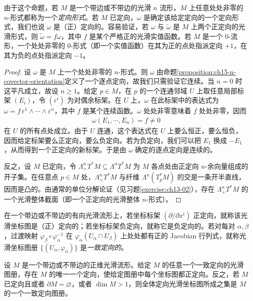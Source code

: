 \documentclass[../../main.tex]{subfiles}
\begin{document}
\begin{remark}
由于这个命题，若 $M$ 是一个带边或不带边的光滑 $n$ 流形，$M$ 上任意处处非零的 $n$-形式都称为一个\emph{定向形式}。若 $M$ 已定向，$\omega$ 是确定该给定定向的一个定向形式，我们也说 $\omega$ 是（正）定向的。容易验证，若 $\omega$ 与 $\widetilde\omega$ 是 $M$ 上两个正定向的光滑形式，则 $\widetilde\omega=f\omega$，其中 $f$ 是某个严格正的光滑实值函数。若 $M$ 是一个 $0$-流形，一个处处非零的 $0$-形式（即一个实值函数）在其为正的点处指派定向 $+1$，在其为负的点处指派定向 $-1$。
\end{remark}

\begin{proof}
设 $\omega$ 是 $M$ 上一个处处非零的 $n$-形式。则 $\omega$ 由命题\ref{proposition:ch15-n-covector-orientation}定义了一个逐点定向，故我们只需验证它连续。当 $n=0$ 时这平凡成立，故设 $n\geqslant1$。给定 $p\in M$，在 $p$ 的一个连通邻域 $U$ 上取任意局部标架 $(E_i)$，令 $(\varepsilon^i)$ 为对偶余标架。在 $U$ 上，$\omega$ 在此标架中的表达式为 $\omega=f\,\varepsilon^1\wedge\cdots\wedge\varepsilon^n$，其中 $f$ 是某个连续函数。$\omega$ 处处非零意味着 $f$ 处处非零，因而
\begin{align*}
\omega(E_1,\cdots ,E_n)=f\ne0
\end{align*}
在 $U$ 的所有点处成立。由于 $U$ 连通，这个表达式在 $U$ 上要么恒正，要么恒负，因而给定标架要么正定向，要么负定向。若为负定向，我们可以把 $E_1$ 换成 $-E_1$，从而得到一个正定向的新标架。于是由 $\omega$ 确定的逐点定向是连续的。

反之，设 $M$ 已定向，令 $\Lambda^n_+T^*M\subseteq\Lambda^n T^*M$ 为 $M$ 各点处由正定向 $n$-余向量组成的开子集。在任意点 $p\in M$ 处，$\Lambda^n_+T^*M$ 与纤维 $\Lambda^n(T^*_pM)$ 的交是一条开半直线，因而是凸的。由通常的单位分解论证（见习题\ref{exercise:ch13-02}），存在 $\Lambda^n_+T^*M$ 的一个光滑整体截面（即一个正定向的光滑整体 $n$-形式）。
\end{proof}

在一个带边或不带边的有向光滑流形上，若坐标标架 $(\partial/\partial x^i)$ 正定向，就称该光滑坐标图是（正）定向的；若坐标标架负定向，就称它是负定向的。若对每对 $\alpha,\beta$，过渡映射 $\varphi_\beta\circ\varphi_\alpha^{-1}$ 在 $\varphi_\alpha(U_\alpha\cap U_\beta)$ 上处处都有正的 Jacobian 行列式，就称光滑坐标图册 $\{(U_\alpha,\varphi_\alpha)\}$ 是\emph{一致定向的}。

\begin{proposition}[坐标图册所确定的定向]\label{proposition:ch15-atlas-orientation}
设 $M$ 是一个带边或不带边的正维光滑流形。给定 $M$ 的任意一个一致定向的光滑图册，存在 $M$ 的唯一一个定向，使给定图册中每个坐标图都正定向。反之，若 $M$ 已定向且或者 $\partial M=\varnothing$，或者 $\dim M>1$，则全体定向光滑坐标图所成之集是 $M$ 的一个一致定向图册。
\end{proposition}
\end{document}
